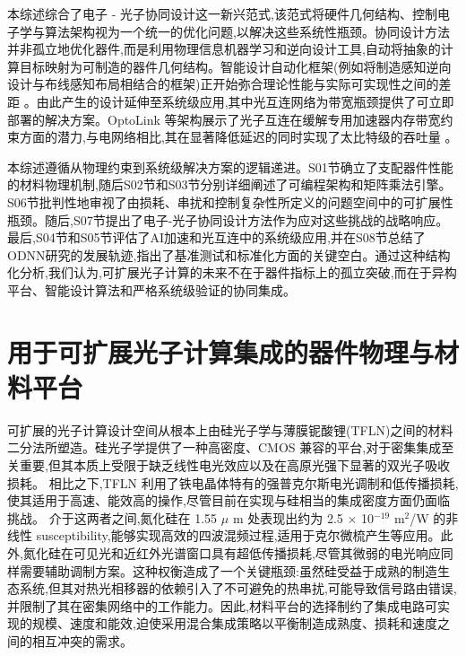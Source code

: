本综述综合了电子 - 光子协同设计这一新兴范式,该范式将硬件几何结构、控制电子学与算法架构视为一个统一的优化问题,以解决这些系统性瓶颈。协同设计方法并非孤立地优化器件,而是利用物理信息机器学习和逆向设计工具,自动将抽象的计算目标映射为可制造的器件几何结构。智能设计自动化框架(例如将制造感知逆向设计与布线感知布局相结合的框架)正开始弥合理论性能与实际可实现性之间的差距 \citep{doi_10_1117_12_3066105_d6297c38}。由此产生的设计延伸至系统级应用,其中光互连网络为带宽瓶颈提供了可立即部署的解决方案。OptoLink 等架构展示了光子互连在缓解专用加速器内存带宽约束方面的潜力,与电网络相比,其在显著降低延迟的同时实现了太比特级的吞吐量 \citep{doi_10_1145_3806395_315ab915}。

本综述遵循从物理约束到系统级解决方案的逻辑递进。S01节确立了支配器件性能的材料物理机制,随后S02节和S03节分别详细阐述了可编程架构和矩阵乘法引擎。S06节批判性地审视了由损耗、串扰和控制复杂性所定义的问题空间中的可扩展性瓶颈。随后,S07节提出了电子-光子协同设计方法作为应对这些挑战的战略响应。最后,S04节和S05节评估了AI加速和光互连中的系统级应用,并在S08节总结了ODNN研究的发展轨迹,指出了基准测试和标准化方面的关键空白。通过这种结构化分析,我们认为,可扩展光子计算的未来不在于器件指标上的孤立突破,而在于异构平台、智能设计算法和严格系统级验证的协同集成。

\section{用于可扩展光子计算集成的器件物理与材料平台}\label{ux7528ux4e8eux53efux6269ux5c55ux5149ux5b50ux8ba1ux7b97ux96c6ux6210ux7684ux5668ux4ef6ux7269ux7406ux4e0eux6750ux6599ux5e73ux53f0}

可扩展的光子计算设计空间从根本上由硅光子学与薄膜铌酸锂(TFLN)之间的材料二分法所塑造。硅光子学提供了一种高密度、CMOS 兼容的平台,对于密集集成至关重要,但其本质上受限于缺乏线性电光效应以及在高原光强下显著的双光子吸收损耗。\citep{doi_10_3390_photonics11040375_bd102ef0} \citep{doi_10_3390_photonics12010005_5e399e5f} 相比之下,TFLN 利用了铁电晶体特有的强普克尔斯电光调制和低传播损耗,使其适用于高速、能效高的操作,尽管目前在实现与硅相当的集成密度方面仍面临挑战。\citep{doi_10_3390_photonics12111129_03f4b6cd} \citep{doi_10_3390_mi17060751_d3932b5d} 介于这两者之间,氮化硅在 1.55 \(\mu\) m 处表现出约为 2.5 \(\times\) 10\(^{-19}\) m\(^{2}\)/W 的非线性 susceptibility,能够实现高效的四波混频过程,适用于克尔微梳产生等应用。此外,氮化硅在可见光和近红外光谱窗口具有超低传播损耗,尽管其微弱的电光响应同样需要辅助调制方案。这种权衡造成了一个关键瓶颈:虽然硅受益于成熟的制造生态系统,但其对热光相移器的依赖引入了不可避免的热串扰,可能导致信号路由错误,并限制了其在密集网络中的工作能力。因此,材料平台的选择制约了集成电路可实现的规模、速度和能效,迫使采用混合集成策略以平衡制造成熟度、损耗和速度之间的相互冲突的需求。\citep{doi_10_48550_arxiv_2209_10098_b3bedb78} \citep{doi_10_1126_science_abj4396_40f36a09} \citep{doi_10_1149_ma2026_01311465mtgabs_643e381a} \citep{doi_10_1109_access_2020_3013116_8fec1fb2}


